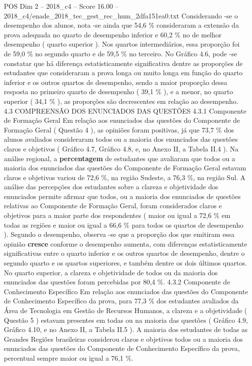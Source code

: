 \begin{textsample}{POS Dim 2 – 2018\_c4 – Score 16.00 – 2018\_c4/enade\_2018\_tec\_gest\_rec\_hum\_2dfa151ea0.txt}
Considerando -se o desempenho dos alunos, nota -se ainda que 54,6 \% consideraram a extensão da prova adequada no quarto de desempenho inferior e 60,2 \% no de melhor desempenho ( quarto superior ).
Nos quartos intermediários, essa proporção foi de 59,0 \% no segundo quarto e de 59,5 \% no terceiro.
No Gráfico 4.6, pode -se constatar que há diferença estatisticamente significativa dentre as proporções de estudantes que consideraram a prova longa ou muito longa em função do quarto inferior e os outros quartos de desempenho, sendo a maior proporção dessa resposta no primeiro quarto de desempenho ( 39,1 \% ), e a menor, no quarto superior ( 34,1 \% ), as proporções são decrescentes em relação ao desempenho. 4.3 COMPREENSÃO DOS ENUNCIADOS DAS QUESTÕES 4.3.1 Componente de Formação Geral Em relação aos enunciados das questões do Componente de Formação Geral ( Questão 4 ), as opiniões foram positivas, já que 73,7 \% dos alunos avaliados consideraram todos ou a maioria dos enunciados das questões claros e objetivos ( Gráfico 4.7, Gráfico 4.8, e, no Anexo II, a Tabela II.4 ).
Na análise regional, a \textbf{percentagem} de estudantes que avaliaram que todos ou a maioria dos enunciados das questões do Componente de Formação Geral estavam claros e objetivos variou de 72,6 \%, na região Sudeste, a 76,3 \%, na região Sul.
A análise das percepções dos estudantes sobre a clareza e objetividade dos enunciados permite afirmar que todos, ou a maioria dos enunciados de questões relativas ao Componente de Formação Geral, foram considerados claros e objetivos para a maior parte dos respondentes ( maior ou igual a 72,6 \% em todas as regiões e maior ou igual a 66,6 \% para todos os quartos de desempenho ).
Segundo o desempenho, observa -se que a proporção dos que emitiram essa opinião \textbf{cresce} conforme o desempenho aumenta, com diferenças estatisticamente significativas entre o quarto inferior e os outros quartos de desempenho, dentre o segundo quarto e os quartos superiores, e também dentre os dois últimos quartos.
No quarto superior, a clareza e objetividade de todos ou da maioria dos enunciados das questões foram percebidas por 80,4 \%. 4.3.2 Componente de Conhecimento Específico Em relação aos enunciados das questões do Componente de Conhecimento Específico da prova, para 77,3 \% dos estudantes avaliados da Área de Tecnologia em Gestão de Recursos Humanos, a clareza e a objetividade ( Questão 5 ) estavam presentes em todas ou na maioria das questões ( Gráfico 4.9, Gráfico 4.10, e no Anexo II, a Tabela II.5 ).
A maioria dos estudantes de todas as Grandes Regiões brasileiras considerou claros e objetivos todos ou a maioria dos enunciados das questões do Componente de Conhecimento Específico da prova, percentual sempre maior ou igual a 76,1 \%.

\end{textsample}

